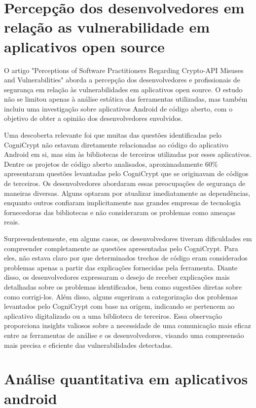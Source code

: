 

\section{Percepção dos desenvolvedores em relação as vulnerabilidade em aplicativos open source}

O artigo "Perceptions of Software Practitioners Regarding Crypto-API Misuses and Vulnerabilities" aborda a percepção dos desenvolvedores e profissionais de segurança em relação às vulnerabilidades em aplicativos open source. O estudo não se limitou apenas à análise estática das ferramentas utilizadas, mas também incluiu uma investigação sobre aplicativos Android de código aberto, com o objetivo de obter a opinião dos desenvolvedores envolvidos.

Uma descoberta relevante foi que muitas das questões identificadas pelo CogniCrypt não estavam diretamente relacionadas ao código do aplicativo Android em si, mas sim às bibliotecas de terceiros utilizadas por esses aplicativos. Dentre os projetos de código aberto analisados, aproximadamente 60\% apresentaram questões levantadas pelo CogniCrypt que se originavam de códigos de terceiros. Os desenvolvedores abordaram essas preocupações de segurança de maneiras diversas. Alguns optaram por atualizar imediatamente as dependências, enquanto outros confiaram implicitamente nas grandes empresas de tecnologia fornecedoras das bibliotecas e não consideraram os problemas como ameaças reais.

Surpreendentemente, em alguns casos, os desenvolvedores tiveram dificuldades em compreender completamente as questões apresentadas pelo CogniCrypt. Para eles, não estava claro por que determinados trechos de código eram considerados problemas apenas a partir das explicações fornecidas pela ferramenta. Diante disso, os desenvolvedores expressaram o desejo de receber explicações mais detalhadas sobre os problemas identificados, bem como sugestões diretas sobre como corrigi-los. Além disso, alguns sugeriram a categorização dos problemas levantados pelo CogniCrypt com base na origem, indicando se pertencem ao aplicativo digitalizado ou a uma biblioteca de terceiros. Essa observação proporciona insights valiosos sobre a necessidade de uma comunicação mais eficaz entre as ferramentas de análise e os desenvolvedores, visando uma compreensão mais precisa e eficiente das vulnerabilidades detectadas.

\section{Análise quantitativa em aplicativos android}

